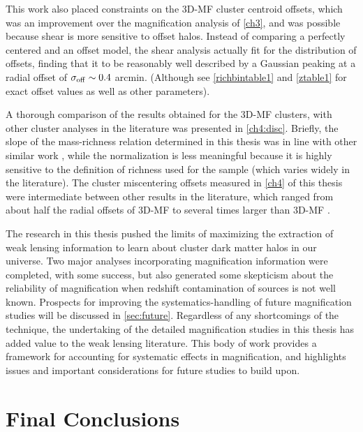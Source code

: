 This work also placed constraints on the \ac{3D-MF} cluster centroid offsets, which was an improvement over the magnification analysis of \autoref{ch3}, and was possible because shear is more sensitive to offset halos. Instead of comparing a perfectly centered and an offset model, the shear analysis actually fit for the distribution of offsets, finding that it to be reasonably well described by a Gaussian peaking at a radial offset of $\sigma_{\rm off} \sim 0.4$ arcmin. (Although see \autoref{richbintable1} and \autoref{ztable1} for exact offset values as well as other parameters). 

A thorough comparison of the results obtained for the \ac{3D-MF} clusters, with other cluster analyses in the literature was presented in \autoref{ch4:disc}. Briefly, the slope of the mass-richness relation determined in this thesis was in line with other similar work \citep{Wen12,Covone14}, while the normalization is less meaningful because it is highly sensitive to the definition of richness used for the sample (which varies widely in the literature). The cluster miscentering offsets measured in \autoref{ch4} of this thesis were intermediate between other results in the literature, which ranged from about half the radial offsets of \ac{3D-MF} \citep{George12} to several times larger than \ac{3D-MF} \citep{Johnston07}.

The research in this thesis pushed the limits of maximizing the extraction of weak lensing information to learn about cluster dark matter halos in our universe. Two major analyses incorporating magnification information were completed, with some success, but also generated some skepticism about the reliability of magnification when redshift contamination of sources is not well known. Prospects for improving the systematics-handling of future magnification studies will be discussed in \autoref{sec:future}. Regardless of any shortcomings of the technique, the undertaking of the detailed magnification studies in this thesis has added value to the weak lensing literature. This body of work provides a framework for accounting for systematic effects in magnification, and highlights issues and important considerations for future studies to build upon.


\section{Final Conclusions}
\label{sec:conc}

